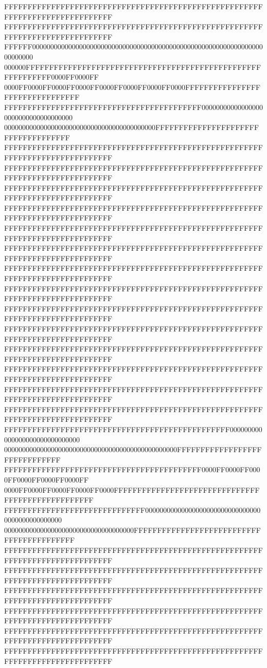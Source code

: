 FFFFFFFFFFFFFFFFFFFFFFFFFFFFFFFFFFFFFFFFFFFFFFFFFFFFFFFFFFFFFFFFFFFFFFFFFFFFFF
FFFFFFFFFFFFFFFFFFFFFFFFFFFFFFFFFFFFFFFFFFFFFFFFFFFFFFFFFFFFFFFFFFFFFFFFFFFFFF
FFFFFF000000000000000000000000000000000000000000000000000000000000000000000000
000000FFFFFFFFFFFFFFFFFFFFFFFFFFFFFFFFFFFFFFFFFFFFFFFFFFFFFFFFFFFF0000FF0000FF
0000FF0000FF0000FF0000FF0000FF0000FF0000FF0000FFFFFFFFFFFFFFFFFFFFFFFFFFFFFFFF
FFFFFFFFFFFFFFFFFFFFFFFFFFFFFFFFFFFFFFFFFF000000000000000000000000000000000000
000000000000000000000000000000000000000000FFFFFFFFFFFFFFFFFFFFFFFFFFFFFFFFFFFF
FFFFFFFFFFFFFFFFFFFFFFFFFFFFFFFFFFFFFFFFFFFFFFFFFFFFFFFFFFFFFFFFFFFFFFFFFFFFFF
FFFFFFFFFFFFFFFFFFFFFFFFFFFFFFFFFFFFFFFFFFFFFFFFFFFFFFFFFFFFFFFFFFFFFFFFFFFFFF
FFFFFFFFFFFFFFFFFFFFFFFFFFFFFFFFFFFFFFFFFFFFFFFFFFFFFFFFFFFFFFFFFFFFFFFFFFFFFF
FFFFFFFFFFFFFFFFFFFFFFFFFFFFFFFFFFFFFFFFFFFFFFFFFFFFFFFFFFFFFFFFFFFFFFFFFFFFFF
FFFFFFFFFFFFFFFFFFFFFFFFFFFFFFFFFFFFFFFFFFFFFFFFFFFFFFFFFFFFFFFFFFFFFFFFFFFFFF
FFFFFFFFFFFFFFFFFFFFFFFFFFFFFFFFFFFFFFFFFFFFFFFFFFFFFFFFFFFFFFFFFFFFFFFFFFFFFF
FFFFFFFFFFFFFFFFFFFFFFFFFFFFFFFFFFFFFFFFFFFFFFFFFFFFFFFFFFFFFFFFFFFFFFFFFFFFFF
FFFFFFFFFFFFFFFFFFFFFFFFFFFFFFFFFFFFFFFFFFFFFFFFFFFFFFFFFFFFFFFFFFFFFFFFFFFFFF
FFFFFFFFFFFFFFFFFFFFFFFFFFFFFFFFFFFFFFFFFFFFFFFFFFFFFFFFFFFFFFFFFFFFFFFFFFFFFF
FFFFFFFFFFFFFFFFFFFFFFFFFFFFFFFFFFFFFFFFFFFFFFFFFFFFFFFFFFFFFFFFFFFFFFFFFFFFFF
FFFFFFFFFFFFFFFFFFFFFFFFFFFFFFFFFFFFFFFFFFFFFFFFFFFFFFFFFFFFFFFFFFFFFFFFFFFFFF
FFFFFFFFFFFFFFFFFFFFFFFFFFFFFFFFFFFFFFFFFFFFFFFFFFFFFFFFFFFFFFFFFFFFFFFFFFFFFF
FFFFFFFFFFFFFFFFFFFFFFFFFFFFFFFFFFFFFFFFFFFFFFFFFFFFFFFFFFFFFFFFFFFFFFFFFFFFFF
FFFFFFFFFFFFFFFFFFFFFFFFFFFFFFFFFFFFFFFFFFFFFFFFFFFFFFFFFFFFFFFFFFFFFFFFFFFFFF
FFFFFFFFFFFFFFFFFFFFFFFFFFFFFFFFFFFFFFFFFFFFFFFF000000000000000000000000000000
000000000000000000000000000000000000000000000000FFFFFFFFFFFFFFFFFFFFFFFFFFFFFF
FFFFFFFFFFFFFFFFFFFFFFFFFFFFFFFFFFFFFFFFFF0000FF0000FF0000FF0000FF0000FF0000FF
0000FF0000FF0000FF0000FF0000FFFFFFFFFFFFFFFFFFFFFFFFFFFFFFFFFFFFFFFFFFFFFFFFFF
FFFFFFFFFFFFFFFFFFFFFFFFFFFFFF000000000000000000000000000000000000000000000000
000000000000000000000000000000000000FFFFFFFFFFFFFFFFFFFFFFFFFFFFFFFFFFFFFFFFFF
FFFFFFFFFFFFFFFFFFFFFFFFFFFFFFFFFFFFFFFFFFFFFFFFFFFFFFFFFFFFFFFFFFFFFFFFFFFFFF
FFFFFFFFFFFFFFFFFFFFFFFFFFFFFFFFFFFFFFFFFFFFFFFFFFFFFFFFFFFFFFFFFFFFFFFFFFFFFF
FFFFFFFFFFFFFFFFFFFFFFFFFFFFFFFFFFFFFFFFFFFFFFFFFFFFFFFFFFFFFFFFFFFFFFFFFFFFFF
FFFFFFFFFFFFFFFFFFFFFFFFFFFFFFFFFFFFFFFFFFFFFFFFFFFFFFFFFFFFFFFFFFFFFFFFFFFFFF
FFFFFFFFFFFFFFFFFFFFFFFFFFFFFFFFFFFFFFFFFFFFFFFFFFFFFFFFFFFFFFFFFFFFFFFFFFFFFF
FFFFFFFFFFFFFFFFFFFFFFFFFFFFFFFFFFFFFFFFFFFFFFFFFFFFFFFFFFFFFFFFFFFFFFFFFFFFFF
